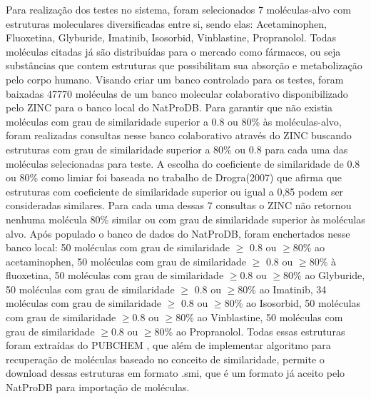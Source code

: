 Para realização dos testes no sistema, foram selecionados 7 moléculas-alvo  com estruturas moleculares diversificadas entre si, sendo elas: Acetaminophen, Fluoxetina, Glyburide, Imatinib, Isosorbid, Vinblastine, Propranolol. Todas moléculas citadas já são distribuídas para o mercado como fármacos, ou seja substâncias que contem estruturas que possibilitam sua absorção e metabolização pelo corpo humano. Visando criar um banco controlado para os testes, foram baixadas 47770 moléculas de um banco molecular colaborativo disponibilizado pelo ZINC \cite{irwin2005zinc} para o banco local do NatProDB. Para garantir que não existia moléculas com grau de similaridade superior a 0.8 ou 80\% às moléculas-alvo, foram realizadas consultas nesse banco colaborativo através do ZINC buscando estruturas com grau de similaridade superior a 80\% ou 0.8 para cada uma das moléculas selecionadas para teste. A escolha do coeficiente de similaridade de 0.8 ou 80\% como limiar foi baseada no trabalho de Drogra(2007) que afirma que estruturas com coeficiente de similaridade superior ou igual a 0,85 podem ser consideradas similares. Para cada uma dessas 7 consultas o ZINC não retornou nenhuma molécula 80\% similar ou com grau de similaridade superior às moléculas alvo. Após populado o banco de dados do NatProDB, foram enchertados nesse banco local: 50 moléculas com grau de similaridade $\geq $ 0.8 ou $\geq $80\% ao acetaminophen, 50 moléculas com grau de similaridade $\geq $ 0.8 ou $\geq $80\% à fluoxetina, 50 moléculas com grau de similaridade $\geq $0.8 ou $\geq $80\% ao Glyburide, 50 moléculas com grau de similaridade $\geq $ 0.8 ou $\geq $80\% ao Imatinib, 34 moléculas com grau de similaridade $\geq $ 0.8 ou $\geq $80\% ao Isosorbid, 50 moléculas com grau de similaridade $\geq $0.8 ou $\geq $80\% ao Vinblastine, 50 moléculas com grau de similaridade $\geq $0.8 ou $\geq $80\% ao Propranolol. Todas essas estruturas foram extraídas do PUBCHEM \cite{li2010pubchem}, que além de implementar algoritmo para recuperação de moléculas baseado no conceito de similaridade, permite o download dessas estruturas em formato .smi, que é um formato já aceito pelo NatProDB para importação de moléculas.

